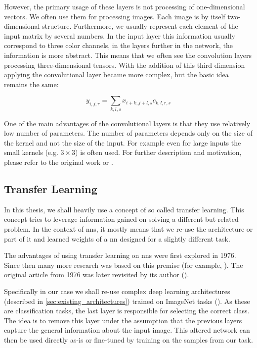 However, the primary usage of these layers is not processing of one-dimensional vectors. We often use them for processing images. Each image is by itself two-dimensional structure. Furthermore, we usually represent each element of the input matrix by several numbers. In the input layer this information usually correspond to three color channels, in the layers further in the network, the information is more abstract. This means that we often see the convolution layers processing three-dimensional tensors. With the addition of this third dimension applying the convolutional layer became more complex, but the basic idea remains the same:

$$y_{i, j, r} = \sum_{k, l, s} x_{i+k, j+l, s} c_{k, l, r, s}$$

One of the main advantages of the convolutional layers is that they use relatively low number of parameters. The number of parameters depends only on the size of the kernel and not the size of the input. For example even for large inputs the small kernels (e.g. $3 \times 3$) is often used. For further description and motivation, please refer to the original work or \cite{deeplearningbook}.

\subsection{Transfer Learning}

\label{ssec:transfer_learning}

In this thesis, we shall heavily use a concept of so called transfer learning. This concept tries to leverage information gained on solving a different but related problem. In the context of \glspl{nn}, it mostly means that we re-use the architecture or part of it and learned weights of a \gls{nn} designed for a slightly different task.


The advantages of using transfer learning on \glspl{nn} were first explored in 1976. Since then many more research was based on this premise (for example, \cite{transferlearning}). The original article from 1976 was later revisited by its author (\cite{transferreviewed}).

Specifically in our case we shall re-use complex deep learning architectures (described in \autoref{sec:existing_architectures}) trained on ImageNet tasks (\cite{imagenetresults}). As these are classification tasks, the last layer is responsible for selecting the correct class. The idea is to remove this layer under the assumption that the previous layers capture the general information about the input image. This altered network can then be used directly as-is or fine-tuned by training on the samples from our task.

